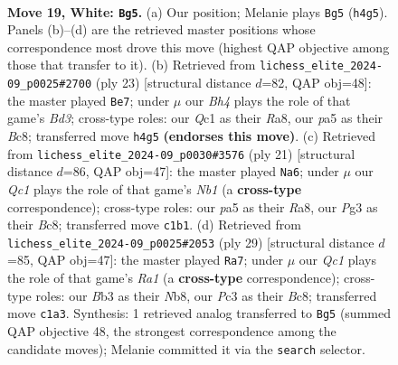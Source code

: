 \documentclass[11pt]{article}
\begin{document}
\begin{figure}[p]
\label{fig:thought-m34}
\end{figure}

\clearpage

\begin{figure}[p]\centering
\begin{subfigure}{0.46\textwidth}\centering
\resizebox{\linewidth}{!}{%
\newchessgame
\chessboard[
  setfen={r3r1k1/1bqn1p1p/5bp1/pppPp3/4P2B/1BP3PN/P4P1P/R1Q1K2R w - - 2 19},
  showmover=false,
  pgfstyle=straightmove, color=movearrow, markmove={h4-g5}
]}
\caption{}
\end{subfigure}\hfill
\begin{subfigure}{0.46\textwidth}\centering
\resizebox{\linewidth}{!}{%
\newchessgame
\chessboard[
  setfen={r1bqr1k1/pp1n1pp1/2pb1p2/8/3P1B1p/2PB3P/PPQ1NPP1/R4RK1 b - - 2 12},
  showmover=false,
  pgfstyle=straightmove, color=movearrow, markmove={d6-e7}
]}
\caption{}
\end{subfigure}
\\[4pt]
\begin{subfigure}{0.46\textwidth}\centering
\resizebox{\linewidth}{!}{%
\newchessgame
\chessboard[
  setfen={rnbqr1k1/pp3pp1/2pb1p2/8/3P1B1p/2PB4/PPQ1NPPP/R4RK1 b - - 1 11},
  showmover=false,
  pgfstyle=straightmove, color=movearrow, markmove={b8-a6}
]}
\caption{}
\end{subfigure}\hfill
\begin{subfigure}{0.46\textwidth}\centering
\resizebox{\linewidth}{!}{%
\newchessgame
\chessboard[
  setfen={rnbqr1k1/5p1p/p2p2p1/1ppPbP2/4P3/2NB1Q2/PP4PP/R1B2R1K b - - 1 15},
  showmover=false,
  pgfstyle=straightmove, color=movearrow, markmove={a8-a7}
]}
\caption{}
\end{subfigure}
\caption{\textbf{Move 19, White: \texttt{Bg5}.} (a) Our position; Melanie plays \texttt{Bg5} (\texttt{h4g5}). Panels (b)--(d) are the retrieved master positions whose correspondence most drove this move (highest QAP objective among those that transfer to it). (b) Retrieved from \texttt{lichess\_elite\_2024-09\_p0025\#2700} (ply 23) [structural distance $d$=82, QAP obj=48]: the master played \texttt{Be7}; under $\mu$ our \emph{Bh4} plays the role of that game's \emph{Bd3}; cross-type roles: our \emph{Q}c1 as their \emph{R}a8, our \emph{p}a5 as their \emph{B}c8; transferred move \texttt{h4g5} \textbf{(endorses this move)}. (c) Retrieved from \texttt{lichess\_elite\_2024-09\_p0030\#3576} (ply 21) [structural distance $d$=86, QAP obj=47]: the master played \texttt{Na6}; under $\mu$ our \emph{Qc1} plays the role of that game's \emph{Nb1} (a \textbf{cross-type} correspondence); cross-type roles: our \emph{p}a5 as their \emph{R}a8, our \emph{P}g3 as their \emph{B}c8; transferred move \texttt{c1b1}. (d) Retrieved from \texttt{lichess\_elite\_2024-09\_p0025\#2053} (ply 29) [structural distance $d$=85, QAP obj=47]: the master played \texttt{Ra7}; under $\mu$ our \emph{Qc1} plays the role of that game's \emph{Ra1} (a \textbf{cross-type} correspondence); cross-type roles: our \emph{B}b3 as their \emph{N}b8, our \emph{P}c3 as their \emph{B}c8; transferred move \texttt{c1a3}. Synthesis: 1 retrieved analog transferred to \texttt{Bg5} (summed QAP objective 48, the strongest correspondence among the candidate moves); Melanie committed it via the \texttt{search} selector.}

\end{figure}
\end{document}
